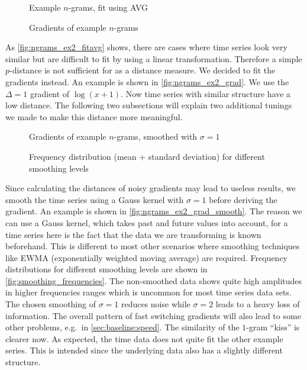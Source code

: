 \begin{figure}
    \centering
    
    \caption{Example $n$-grams, fit using AVG}\label{fig:ngrams_ex2_fitavg}
\end{figure}

\begin{figure}
    \centering
    
    \caption{Gradients of example $n$-grams}\label{fig:ngrams_ex2_grad}
\end{figure}

As \autoref{fig:ngrams_ex2_fitavg} shows, there are cases where time series look very similar but are difficult to fit by using a linear transformation. Therefore a simple $p$-distance is not sufficient for as a distance measure. We decided to fit the gradients instead. An example is shown in \autoref{fig:ngrams_ex2_grad}. We use the $\Delta = 1$ gradient of $\log(x + 1)$. Now time series with similar structure have a low distance. The following two subsections will explain two additional tunings we made to make this distance more meaningful.

\begin{figure}
    \centering
    
    \caption{Gradients of example $n$-grams, smoothed with $\sigma = 1$}\label{fig:ngrams_ex2_grad_smooth}
\end{figure}

\begin{figure}
    \centering
    
    \caption{Frequency distribution (mean + standard deviation) for different smoothing levels}\label{fig:smoothing_frequencies}
\end{figure}

Since calculating the distances of noisy gradients may lead to useless results, we smooth the time series using a Gauss kernel with $\sigma = 1$ before deriving the gradient. An example is shown in \autoref{fig:ngrams_ex2_grad_smooth}. The reason we can use a Gauss kernel, which takes past and future values into account, for a time series here is the fact that the data we are transforming is known beforehand. This is different to most other scenarios where smoothing techniques like EWMA (exponentially weighted moving average) are required. Frequency distributions for different smoothing levels are shown in \autoref{fig:smoothing_frequencies}. The non-smoothed data shows quite high amplitudes in higher frequencies ranges which is uncommon for most time series data sets. The chosen smoothing of $\sigma = 1$ reduces noise while $\sigma = 2$ leads to a heavy loss of information. The overall pattern of fast switching gradients will also lead to some other problems, e.g.\ in \autoref{sec:baseline:speed}. The similarity of the $1$-gram \enquote{kiss} is clearer now. As expected, the time data does not quite fit the other example series. This is intended since the underlying data also has a slightly different structure.


